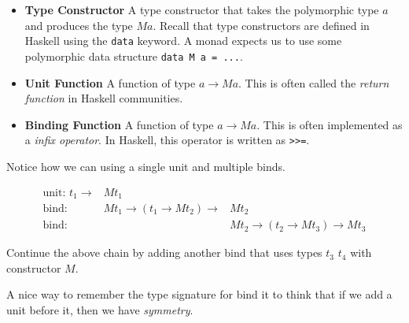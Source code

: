 \begin{itemize}   
\renewcommand{\labelitemi}{$\Box$}
\item \textbf{Type Constructor} A type constructor that takes the 
polymorphic type $a$ and produces the type $M a$. 
Recall that type constructors are defined in Haskell using the 
\lstinline{data} keyword. A monad expects us to use some polymorphic 
data structure
\lstinline{data M a = ...}. 
\item \textbf{Unit Function} A function of type $a \rightarrow M a$. 
This is often called the \textit{return function} in Haskell communities.
\item \textbf{Binding Function} 
A function of type $a \rightarrow M a$. 
This is often implemented as a \textit{infix operator}. 
In Haskell, this operator is written as \lstinline{>>=}. 
\end{itemize}

Notice how we can  using a single unit 
and multiple binds. 

\[ 
\begin{array}{lll}
\text{unit: } t_1 \rightarrow & M t_1 \\
\text{bind: }  & M t_1 \rightarrow (t_1 \rightarrow M t_2) \rightarrow & M t_2 \\
\text{bind: }  & & M t_2 \rightarrow (t_2 \rightarrow M t_3) \rightarrow M t_3
\end{array}
\] 

\begin{example}
Continue the above chain by adding another bind that 
uses types $t_3$ $t_4$ with constructor $M$.
\end{example}



A nice way to remember the type signature for bind it to think that if
we add a unit before it, then we have \textit{symmetry}. 
